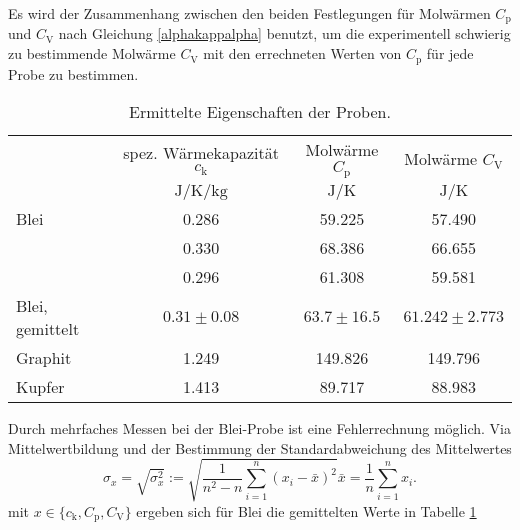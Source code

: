 Es wird der Zusammenhang zwischen den beiden Festlegungen für Molwärmen $C_\text{p}$ und $C_\text{V}$ nach Gleichung \eqref{alphakappalpha} benutzt, um
die experimentell schwierig zu bestimmende Molwärme $C_\text{V}$ mit den errechneten Werten von $C_\text{p}$ für jede Probe zu bestimmen.
\begin{table}[htbp]
	\centering
	\begin{tabular}{lccc}
		\toprule
		&{spez. Wärmekapazität $c_\text{k}$}& {Molwärme $C_\text{p}$}  &{Molwärme $C_\text{V}$}\\
		&{$\si{\joule\per\kelvin\per\kilo\gram}$}  &{$\si{\joule\per\kelvin}$}& {$\si{\joule\per\kelvin}$}\\
		\midrule
		{Blei}	&0.286	&59.225	& 57.490\\
				&0.330	&68.386	& 66.655\\
				&0.296	&61.308	& 59.581\\
		{Blei, gemittelt}	&$0.31\pm0.08$	&$63.7\pm16.5$	&$61.242\pm2.773$\\
		{Graphit}&1.249 &149.826& 149.796\\
		{Kupfer}&1.413	&89.717	& 88.983\\
		\bottomrule
	\end{tabular}
	\caption{Ermittelte Eigenschaften der Proben.}
	\label{wert:proben}
\end{table}
Durch mehrfaches Messen bei der Blei-Probe ist eine Fehlerrechnung möglich.
Via Mittelwertbildung und der Bestimmung der Standardabweichung des Mittelwertes
\begin{subequations}
	\begin{equation}
		\sigma_x = \sqrt{\sigma_x^2} := \sqrt{\frac{1}{n^2-n} \sum_{i=1}^n{(x_i-\bar{x})^2}}
	\end{equation}
	\begin{equation}
		\bar{x} = \frac{1}{n} \sum_{i=1}^n{x_i}.
	\end{equation}
\end{subequations}
mit $x\in\{c_\mathup{k},C_\mathup{p},C_\mathup{V}\}$ ergeben sich für Blei die gemittelten Werte in Tabelle \ref{wert:proben}


